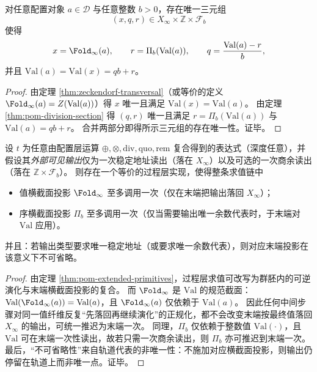 \begin{theorem}\label{thm:pom-double-transversal-normal-form}
对任意配置对象 $a\in\mathcal D$ 与任意整数 $b>0$，存在唯一三元组
\[
\boxed{(x,q,r)\in X_\infty\times\mathbb{Z}\times\mathcal F_b}
\]
使得
\[
x=\Fold_\infty(a),\qquad
r=\Pi_b(\mathrm{Val}(a)),\qquad
q=\frac{\mathrm{Val}(a)-r}{b},
\]
并且 \(\mathrm{Val}(a)=\mathrm{Val}(x)=qb+r\)。
\end{theorem}
\begin{proof}
由定理 \ref{thm:zeckendorf-transversal}（或等价的定义 \(\Fold_\infty(a)=Z(\mathrm{Val}(a))\)）得 \(x\) 唯一且满足 \(\mathrm{Val}(x)=\mathrm{Val}(a)\)。
由定理 \ref{thm:pom-division-section} 得 \((q,r)\) 唯一且满足 \(r=\Pi_b(\mathrm{Val}(a))\) 与 \(\mathrm{Val}(a)=qb+r\)。
合并两部分即得所示三元组的存在唯一性。证毕。
\end{proof}

\begin{corollary}\label{cor:pom-projection-budget}
设 \(t\) 为任意由配置层运算 \(\oplus,\otimes,\mathrm{div},\mathrm{quo},\mathrm{rem}\) 复合得到的表达式（深度任意），并假设其\emph{外部可见输出}仅为一次稳定地址读出（落在 \(X_\infty\)）以及可选的一次商余读出（落在 \(\mathbb Z\times\mathcal F_b\)）。
则存在一个等价的过程层实现，使得整条求值链中
\begin{itemize}
  \item 值横截面投影 \(\Fold_\infty\) 至多调用一次（仅在末端把输出落回 \(X_\infty\)）；
  \item 序横截面投影 \(\Pi_b\) 至多调用一次（仅当需要输出唯一余数代表时，于末端对 \(\mathrm{Val}\) 应用）。
\end{itemize}
并且：若输出类型要求唯一稳定地址（或要求唯一余数代表），则对应末端投影在该意义下不可省略。
\end{corollary}
\begin{proof}
由定理 \ref{thm:pom-extended-primitives}，过程层求值可改写为群胚内的可逆演化与末端横截面投影的复合。
而 \(\Fold_\infty\) 是 \(\mathrm{Val}\) 的规范截面：\(\mathrm{Val}(\Fold_\infty(a))=\mathrm{Val}(a)\)，且 \(\Fold_\infty(a)\) 仅依赖于 \(\mathrm{Val}(a)\)。
因此任何中间步骤对同一值纤维反复“先落回再继续演化”的正规化，都不会改变末端按最终值落回 \(X_\infty\) 的输出，可统一推迟为末端一次。
同理，\(\Pi_b\) 仅依赖于整数值 \(\mathrm{Val}(\cdot)\)，且 \(\mathrm{Val}\) 可在末端一次性读出，故若只需一次商余读出，则 \(\Pi_b\) 亦可推迟到末端一次。
最后，“不可省略性”来自轨道代表的非唯一性：不施加对应横截面投影，则输出仍停留在轨道上而非唯一点。证毕。
\end{proof}

